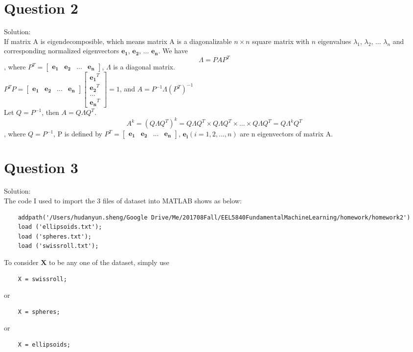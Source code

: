 \documentclass[a4paper]{article}
\begin{document}
\begin{spacing}{2.0}
	
\section*{\huge\textbf{ Question 2} }	\large{Solution:\\}
	\normalsize
	If matrix A is eigendecomposible, which means matrix A is a diagonalizable $n\times n$ square matrix with $n$ eigenvalues $\lambda_1$,  $			\lambda_2$, ...  $\lambda_n$ and corresponding normalized eigenvectors $\mathbf{e_1}$,  $\mathbf{e_2}$, ...  $\mathbf{e_n}$. We have
	$$\Lambda = PAP^T$$
	, where $P^T = \left[\begin{matrix} \mathbf{e_1} & \mathbf{e_2} & ...& \mathbf{e_n}\end{matrix}\right]$, $\Lambda$ is a diagonal matrix.\\
	$P^TP = \left[\begin{matrix} \mathbf{e_1} & \mathbf{e_2} & ... & \mathbf{e_n}\end{matrix}\right] \left[ \begin{matrix}  \mathbf{e_1}^T \\ \mathbf{e_2}^T 	\\ ... \\ \mathbf{e_n}^T\end{matrix}\right] = 1$, and $A = P^{-1}\Lambda(P^T)^{-1}$\\
	Let $Q = P^{-1}$, then $A = Q\Lambda Q^T$.\\
	$$A^k = (Q\Lambda Q^T)^k = Q\Lambda Q^T \times Q \Lambda Q^T \times ... \times Q\Lambda Q^T = Q\Lambda ^k Q^T$$
	, where $Q = P^{-1}$, P is 	defined by $P^T = \left[\begin{matrix} \mathbf{e_1} & \mathbf{e_2} & ...& \mathbf{e_n}\end{matrix}\right]$, $
	\mathbf{e_i}(i = 1, 2, ..., n)$ are n eigenvectors of matrix A. 


\section*{\huge\textbf{ Question 3} } \large{Solution:\\}
	\normalsize The code I used to import the 3 files of dataset into MATLAB shows as below:
	\begin{lstlisting}
	addpath('/Users/hudanyun.sheng/Google Drive/Me/201708Fall/EEL5840FundamentalMachineLearning/homework/homework2')
	load ('ellipsoids.txt');
	load ('spheres.txt');
	load ('swissroll.txt');
	\end{lstlisting}
	To consider $\mathbf{X}$ to be any one of the dataset, simply use
	\begin{lstlisting}
	X = swissroll;
	\end{lstlisting}
	or 
	\begin{lstlisting}
	X = spheres;
	\end{lstlisting}
	or
	\begin{lstlisting}
	X = ellipsoids;
	\end{lstlisting}
	

\end{spacing}
\end{document}
